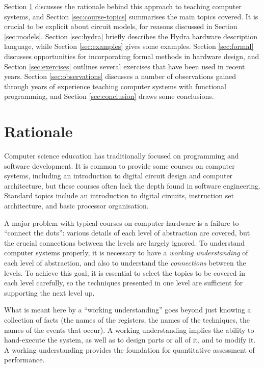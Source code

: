 \documentclass[submission,copyright,creativecommons]{eptcs}
\begin{document}
Section \ref{sec:rationale} discusses the rationale behind this
approach to teaching computer systems, and Section
\ref{sec:course-topics} summarises the main topics covered.  It is
crucial to be explicit about circuit models, for reasons discussed in
Section \ref{sec:models}.  Section \ref{sec:hydra} briefly describes
the Hydra hardware description language, while Section
\ref{sec:examples} gives some examples.  Section \ref{sec:formal}
discusses opportunities for incorporating formal methods in hardware
design, and Section \ref{sec:exercises} outlines several exercises
that have been used in recent years.  Section \ref{sec:observations}
discusses a number of observations gained through years of experience
teaching computer systems with functional programming, and Section
\ref{sec:conclusion} draws some conclusions.

\section{Rationale}
\label{sec:rationale}

Computer science education has traditionally focused on
programming and software development.  It is common to provide some
courses on computer systems, including an introduction to digital
circuit design and computer architecture, but these courses often
lack the depth found in software engineering.  Standard topics
include an introduction to digital circuits, instruction set
architecture, and basic processor organisation.

A major problem with typical courses on computer hardware is a failure
to ``connect the dots'': various details of each level of abstraction
are covered, but the crucial connections between the levels are
largely ignored.  To understand computer systems properly, it is
necessary to have a \emph{working understanding} of each level of
abstraction, and also to understand the \emph{connections} between the
levels.  To achieve this goal, it is essential to select the topics to
be covered in each level carefully, so the techniques presented in one
level are sufficient for supporting the next level up.

What is meant here by a ``working understanding'' goes beyond just
knowing a collection of facts (the names of the registers, the names
of the techniques, the names of the events that occur).  A working
understanding implies the ability to hand-execute the system, as well
as to design parts or all of it, and to modify it.  A working
understanding provides the foundation for quantitative assessment of
performance.
\end{document}
